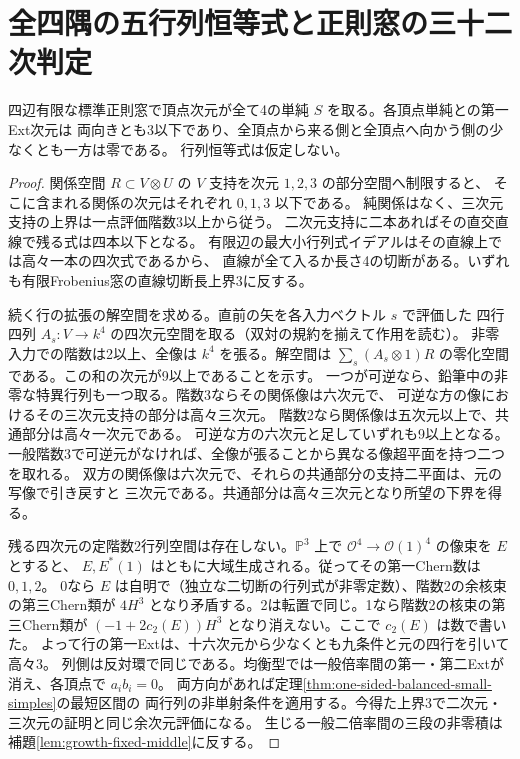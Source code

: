 \section{全四隅の五行列恒等式と正則窓の三十二次判定}
\label{sec:five-matrix-finite-windows}
\begin{lemma}\label{lem:four-balanced-one-direction}
四辺有限な標準正則窓で頂点次元が全て4の単純 $S$ を取る。各頂点単純との第一Ext次元は
両向きとも3以下であり、全頂点から来る側と全頂点へ向かう側の少なくとも一方は零である。
行列恒等式は仮定しない。
\end{lemma}
\begin{proof}
関係空間 $R\subset V\otimes U$ の $V$ 支持を次元 $1,2,3$ の部分空間へ制限すると、
そこに含まれる関係の次元はそれぞれ $0,1,3$ 以下である。
純関係はなく、三次元支持の上界は一点評価階数3以上から従う。
二次元支持に二本あればその直交直線で残る式は四本以下となる。
有限辺の最大小行列式イデアルはその直線上では高々一本の四次式であるから、
直線が全て入るか長さ4の切断がある。いずれも有限Frobenius窓の直線切断長上界3に反する。

続く行の拡張の解空間を求める。直前の矢を各入力ベクトル $s$ で評価した
四行四列 $A_s:V\to k^4$ の四次元空間を取る（双対の規約を揃えて作用を読む）。
非零入力での階数は2以上、全像は $k^4$ を張る。解空間は
$\sum_s(A_s\otimes1)R$ の零化空間である。この和の次元が9以上であることを示す。
一つが可逆なら、鉛筆中の非零な特異行列も一つ取る。階数3ならその関係像は六次元で、
可逆な方の像におけるその三次元支持の部分は高々三次元。
階数2なら関係像は五次元以上で、共通部分は高々一次元である。
可逆な方の六次元と足していずれも9以上となる。
一般階数3で可逆元がなければ、全像が張ることから異なる像超平面を持つ二つを取れる。
双方の関係像は六次元で、それらの共通部分の支持二平面は、元の写像で引き戻すと
三次元である。共通部分は高々三次元となり所望の下界を得る。

残る四次元の定階数2行列空間は存在しない。$\mathbb P^3$ 上で
$\mathcal O^4\to\mathcal O(1)^4$ の像束を $E$ とすると、
$E,E^*(1)$ はともに大域生成される。従ってその第一Chern数は $0,1,2$。
0なら $E$ は自明で（独立な二切断の行列式が非零定数）、階数2の余核束の第三Chern類が
$4H^3$ となり矛盾する。2は転置で同じ。1なら階数2の核束の第三Chern類が
$(-1+2c_2(E))H^3$ となり消えない。ここで $c_2(E)$ は数で書いた。
よって行の第一Extは、十六次元から少なくとも九条件と元の四行を引いて高々3。
列側は反対環で同じである。均衡型では一般倍率間の第一・第二Extが消え、各頂点で $a_i b_i=0$。
両方向があれば定理\ref{thm:one-sided-balanced-small-simples}の最短区間の
両行列の非単射条件を適用する。今得た上界3で二次元・三次元の証明と同じ余次元評価になる。
生じる一般二倍率間の三段の非零積は補題\ref{lem:growth-fixed-middle}に反する。
\end{proof}

